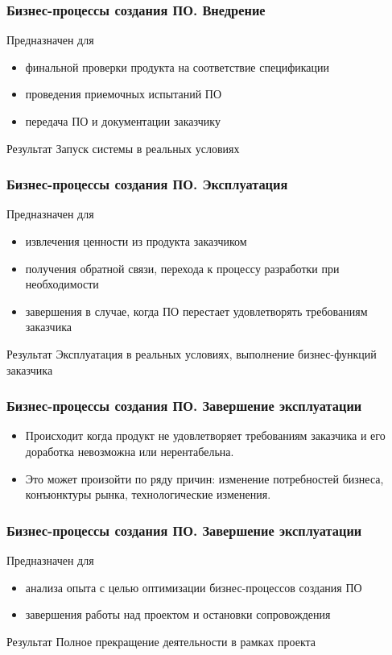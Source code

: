 \documentclass{../industrial-development}
\begin{document}
\begin{frame} \frametitle{Бизнес-процессы создания ПО. Внедрение}
	\begin{block}{Предназначен для}
		\begin{itemize}
			\item финальной проверки продукта на соответствие спецификации
			\item проведения приемочных испытаний ПО
			\item передача ПО и документации заказчику
		\end{itemize}
	\end{block}
	\begin{block}{Результат}
		Запуск системы в реальных условиях
	\end{block}
\end{frame}
\lecturenotes


\begin{frame} \frametitle{Бизнес-процессы создания ПО. Эксплуатация}
	\begin{block}{Предназначен для}
		\begin{itemize}
			\item извлечения ценности из продукта заказчиком
			\item получения обратной связи, перехода к процессу разработки при необходимости
			\item завершения в случае, когда ПО перестает удовлетворять требованиям заказчика
		\end{itemize}
	\end{block}
	\begin{block}{Результат}
		Эксплуатация в реальных условиях, выполнение бизнес-функций заказчика
	\end{block}
\end{frame}
\lecturenotes


\begin{frame} \frametitle{Бизнес-процессы создания ПО. Завершение эксплуатации}
	\begin{itemize}
		\item Происходит когда продукт не удовлетворяет требованиям заказчика и его доработка невозможна или нерентабельна.
		\item Это может произойти по ряду причин: изменение потребностей бизнеса, конъюнктуры рынка, технологические изменения.
	\end{itemize}
\end{frame}
\lecturenotes


\begin{frame} \frametitle{Бизнес-процессы создания ПО. Завершение эксплуатации}
	\begin{block}{Предназначен для}
		\begin{itemize}
			\item анализа опыта с целью оптимизации бизнес-процессов создания ПО
			\item завершения работы над проектом и остановки сопровождения
		\end{itemize}
	\end{block}
	\begin{block}{Результат}
		Полное прекращение деятельности в рамках проекта
	\end{block}
\end{frame}
\lecturenotes
\end{document}
